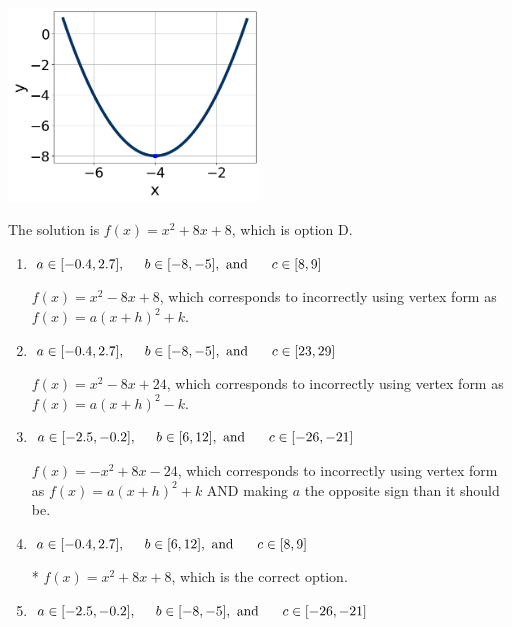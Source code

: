 \documentclass{extbook}[14pt]
\begin{document}
\begin{enumerate}
{\begin{center}
    \includegraphics[width=0.5\textwidth]{../Figures/quadraticGraphToEquationC.png}
\end{center}




The solution is \( f(x) = x^{2} +8 x + 8 \), which is option D.\begin{enumerate}[label=\Alph*.]
\item \( a \in [-0.4, 2.7], \hspace*{5mm} b \in [-8, -5], \text{ and } \hspace*{5mm} c \in [8, 9] \)

$f(x)=x^{2} -8 x + 8$, which corresponds to incorrectly using vertex form as $f(x) = a(x+h)^2+k$.
\item \( a \in [-0.4, 2.7], \hspace*{5mm} b \in [-8, -5], \text{ and } \hspace*{5mm} c \in [23, 29] \)

$f(x)=x^{2} -8 x + 24$, which corresponds to incorrectly using vertex form as $f(x) = a(x+h)^2 - k$.
\item \( a \in [-2.5, -0.2], \hspace*{5mm} b \in [6, 12], \text{ and } \hspace*{5mm} c \in [-26, -21] \)

$f(x)=-x^{2} +8 x -24$, which corresponds to incorrectly using vertex form as $f(x) = a(x+h)^2+k$ AND making $a$ the opposite sign than it should be.
\item \( a \in [-0.4, 2.7], \hspace*{5mm} b \in [6, 12], \text{ and } \hspace*{5mm} c \in [8, 9] \)

* $f(x)=x^{2} +8 x + 8$, which is the correct option.
\item \( a \in [-2.5, -0.2], \hspace*{5mm} b \in [-8, -5], \text{ and } \hspace*{5mm} c \in [-26, -21] \)


\end{enumerate}}
\end{enumerate}
\end{document}
